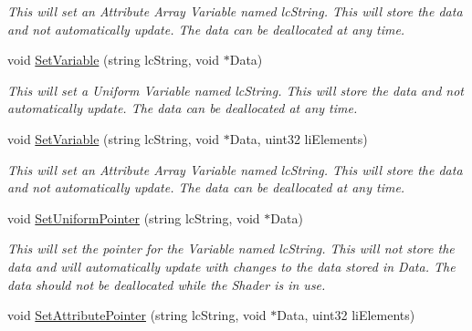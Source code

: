 \begin{DoxyCompactItemize}
\begin{DoxyCompactList}\small\item\em This will set an Attribute Array Variable named lcString. This will store the data and not automatically update. The data can be deallocated at any time. \end{DoxyCompactList}\item 
\hypertarget{classc_render_object_a4682c572a677af8b63883e7e01bbdb1c}{
void \hyperlink{classc_render_object_a4682c572a677af8b63883e7e01bbdb1c}{SetVariable} (string lcString, void $\ast$Data)}
\label{classc_render_object_a4682c572a677af8b63883e7e01bbdb1c}

\begin{DoxyCompactList}\small\item\em This will set a Uniform Variable named lcString. This will store the data and not automatically update. The data can be deallocated at any time. \end{DoxyCompactList}\item 
\hypertarget{classc_render_object_a2ac23f3c4b20c29a46be82b015ef67cb}{
void \hyperlink{classc_render_object_a2ac23f3c4b20c29a46be82b015ef67cb}{SetVariable} (string lcString, void $\ast$Data, uint32 liElements)}
\label{classc_render_object_a2ac23f3c4b20c29a46be82b015ef67cb}

\begin{DoxyCompactList}\small\item\em This will set an Attribute Array Variable named lcString. This will store the data and not automatically update. The data can be deallocated at any time. \end{DoxyCompactList}\item 
\hypertarget{classc_render_object_a000b32ac1da318565314489ca596601c}{
void \hyperlink{classc_render_object_a000b32ac1da318565314489ca596601c}{SetUniformPointer} (string lcString, void $\ast$Data)}
\label{classc_render_object_a000b32ac1da318565314489ca596601c}

\begin{DoxyCompactList}\small\item\em This will set the pointer for the Variable named lcString. This will not store the data and will automatically update with changes to the data stored in Data. The data should not be deallocated while the Shader is in use. \end{DoxyCompactList}\item 
\hypertarget{classc_render_object_a3add8b05fc1d7f4d910149a4f86e2877}{
void \hyperlink{classc_render_object_a3add8b05fc1d7f4d910149a4f86e2877}{SetAttributePointer} (string lcString, void $\ast$Data, uint32 liElements)}
\label{classc_render_object_a3add8b05fc1d7f4d910149a4f86e2877}


\end{DoxyCompactItemize}
